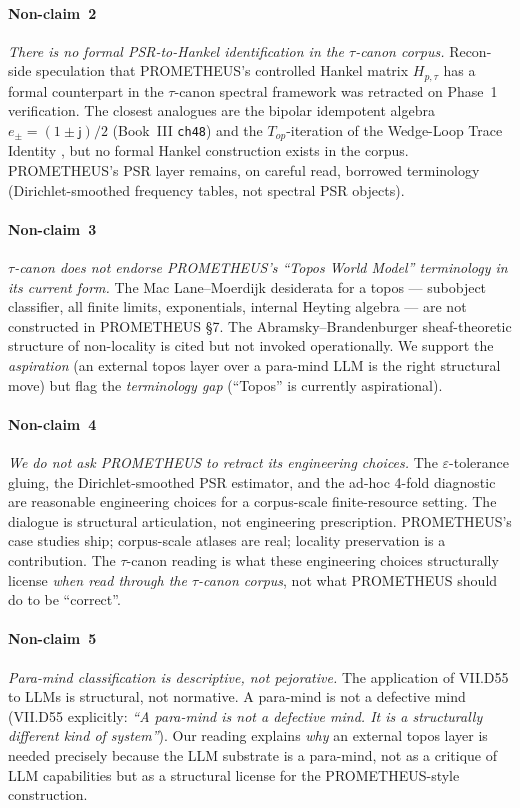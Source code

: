 \documentclass{pantarhei-researchnote}
\newcommand{\jj}{\mathsf{j}}
\begin{document}
\paragraph{Non-claim~2}
\emph{There is no formal PSR-to-Hankel identification in the
$\tau$-canon corpus.} Recon-side speculation that PROMETHEUS's
controlled Hankel matrix $H_{p, \tau}$ has a formal counterpart in
the $\tau$-canon spectral framework was retracted on Phase~1
verification. The closest analogues are the bipolar idempotent
algebra $e_{\pm} = (1 \pm \jj)/2$ (Book~III \texttt{ch48}) and the
$T_{op}$-iteration of the Wedge-Loop Trace Identity
\cite{FuchsFuchs-T1-v1}, but no formal Hankel construction exists
in the corpus. PROMETHEUS's PSR layer remains, on careful read,
borrowed terminology (Dirichlet-smoothed frequency tables, not
spectral PSR objects).

\paragraph{Non-claim~3}
\emph{$\tau$-canon does not endorse PROMETHEUS's ``Topos World
Model'' terminology in its current form.} The Mac Lane--Moerdijk
\cite{MacLane-Moerdijk-1992} desiderata for a topos --- subobject
classifier, all finite limits, exponentials, internal Heyting
algebra --- are not constructed in PROMETHEUS §7. The Abramsky--Brandenburger
\cite{Abramsky-Brandenburger-2011} sheaf-theoretic structure of
non-locality is cited but not invoked operationally. We support the
\emph{aspiration} (an external topos layer over a para-mind LLM is
the right structural move) but flag the \emph{terminology gap}
(``Topos'' is currently aspirational).

\paragraph{Non-claim~4}
\emph{We do not ask PROMETHEUS to retract its engineering choices.}
The $\varepsilon$-tolerance gluing, the Dirichlet-smoothed PSR
estimator, and the ad-hoc 4-fold diagnostic are reasonable
engineering choices for a corpus-scale finite-resource setting.
The dialogue is structural articulation, not engineering
prescription. PROMETHEUS's case studies ship; corpus-scale atlases
are real; locality preservation is a contribution. The $\tau$-canon
reading is what these engineering choices structurally license
\emph{when read through the $\tau$-canon corpus}, not what
PROMETHEUS should do to be ``correct''.

\paragraph{Non-claim~5}
\emph{Para-mind classification is descriptive, not pejorative.}
The application of VII.D55 to LLMs is structural, not normative. A
para-mind is not a defective mind (VII.D55 explicitly:
\textit{``A para-mind is not a defective mind. It is a
structurally different kind of system''}). Our reading explains
\emph{why} an external topos layer is needed precisely because the
LLM substrate is a para-mind, not as a critique of LLM
capabilities but as a structural license for the PROMETHEUS-style
construction.
\end{document}
